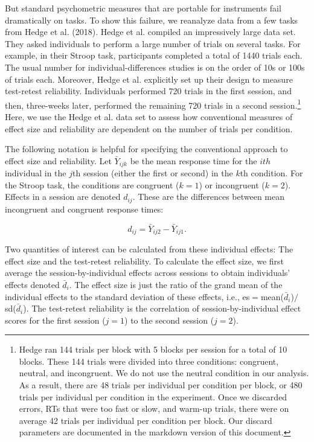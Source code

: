 \documentclass[english,man]{apa6}
\theoremstyle{definition}
\theoremstyle{definition}
\theoremstyle{definition}
\theoremstyle{remark}
\begin{document}
But standard psychometric measures that are portable for instruments
fail dramatically on tasks. To show this failure, we reanalyze data from
a few tasks from Hedge et al. (2018). Hedge et al. compiled an
impressively large data set. They asked individuals to perform a large
number of trials on several tasks. For example, in their Stroop task,
participants completed a total of 1440 trials each. The usual number for
individual-differences studies is on the order of 10s or 100s of trials
each. Moreover, Hedge et al. explicitly set up their design to measure
test-retest reliability. Individuals performed 720 trials in the first
session, and then, three-weeks later, performed the remaining 720 trials
in a second session.\footnote{Hedge ran 144 trials per block with 5
  blocks per session for a total of 10 blocks. These 144 trials were
  divided into three conditions: congruent, neutral, and incongruent. We
  do not use the neutral condition in our analysis. As a result, there
  are 48 trials per individual per condition per block, or 480 trials
  per individual per condition in the experiment. Once we discarded
  errors, RTs that were too fast or slow, and warm-up trials, there were
  on average 42 trials per individual per condition per block. Our
  discard parameters are documented in the markdown version of this
  document.} Here, we use the Hedge et al. data set to assess how
conventional measures of effect size and reliability are dependent on
the number of trials per condition.

The following notation is helpful for specifying the conventional
approach to effect size and reliability. Let \(\bar{Y}_{ijk}\) be the
mean response time for the \(ith\) individual in the \(j\)th session
(either the first or second) in the \(k\)th condition. For the Stroop
task, the conditions are congruent (\(k=1\)) or incongruent (\(k=2\)).
Effects in a session are denoted \(d_{ij}\). These are the differences
between mean incongruent and congruent response times:

\begin{equation} \label{samp.eff}
d_{ij}=\bar{Y}_{ij2}-\bar{Y}_{ij1}. 
\end{equation}

Two quantities of interest can be calculated from these individual
effects: The effect size and the test-retest reliability. To calculate
the effect size, we first average the session-by-individual effects
across sessions to obtain individuals' effects denoted \(\bar{d}_{i}\).
The effect size is just the ratio of the grand mean of the individual
effects to the standard deviation of these effects, i.e.,
es\(=\)mean(\(\bar{d}_{i}\))\(/\)sd(\(\bar{d}_{i}\)). The test-retest
reliability is the correlation of session-by-individual effect scores
for the first session (\(j=1\)) to the second session (\(j=2\)).
\end{document}
